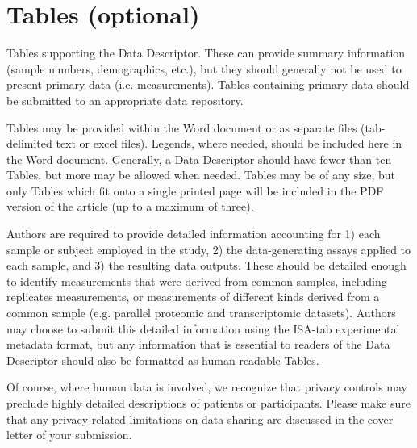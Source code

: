 \section{Tables (optional)}

Tables supporting the Data Descriptor.  These can provide summary information (sample numbers, demographics, etc.), but they should generally not be used to present primary data (i.e. measurements). Tables containing primary data should be submitted to an appropriate data repository. 

Tables may be provided within the Word document or as separate files (tab-delimited text or excel files).  Legends, where needed, should be included here in the Word document. Generally, a Data Descriptor should have fewer than ten Tables, but more may be allowed when needed. Tables may be of any size, but only Tables which fit onto a single printed page will be included in the PDF version of the article (up to a maximum of three).   

Authors are required to provide detailed information accounting for 1) each sample or subject employed in the study, 2) the data-generating assays applied to each sample, and 3) the resulting data outputs. These should be detailed enough to identify measurements that were derived from common samples, including replicates measurements, or measurements of different kinds derived from a common sample (e.g. parallel proteomic and transcriptomic datasets). Authors may choose to submit this detailed information using the ISA-tab experimental metadata format, but any information that is essential to readers of the Data Descriptor should also be formatted as human-readable Tables. 

Of course, where human data is involved, we recognize that privacy controls may preclude highly detailed descriptions of patients or participants. Please make sure that any privacy-related limitations on data sharing are discussed in the cover letter of your submission.  
